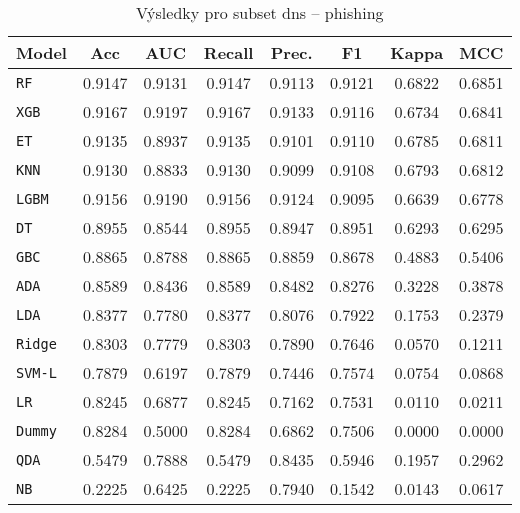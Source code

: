 \begin{table}[H]
  \centering
  \small
  \caption{Výsledky pro subset dns – phishing}
  \begin{tabular}{|l|c|c|c|c|c|c|c|}
    \hline
    \textbf{Model} & \textbf{Acc} & \textbf{AUC} & \textbf{Recall} & \textbf{Prec.} & \textbf{F1} & \textbf{Kappa} & \textbf{MCC} \\
    \hline
    \texttt{RF} & 0.9147 & 0.9131 & 0.9147 & 0.9113 & 0.9121 & 0.6822 & 0.6851 \\
    \texttt{XGB} & 0.9167 & 0.9197 & 0.9167 & 0.9133 & 0.9116 & 0.6734 & 0.6841 \\
    \texttt{ET} & 0.9135 & 0.8937 & 0.9135 & 0.9101 & 0.9110 & 0.6785 & 0.6811 \\
    \texttt{KNN} & 0.9130 & 0.8833 & 0.9130 & 0.9099 & 0.9108 & 0.6793 & 0.6812 \\
    \texttt{LGBM} & 0.9156 & 0.9190 & 0.9156 & 0.9124 & 0.9095 & 0.6639 & 0.6778 \\
    \texttt{DT} & 0.8955 & 0.8544 & 0.8955 & 0.8947 & 0.8951 & 0.6293 & 0.6295 \\
    \texttt{GBC} & 0.8865 & 0.8788 & 0.8865 & 0.8859 & 0.8678 & 0.4883 & 0.5406 \\
    \texttt{ADA} & 0.8589 & 0.8436 & 0.8589 & 0.8482 & 0.8276 & 0.3228 & 0.3878 \\
    \texttt{LDA} & 0.8377 & 0.7780 & 0.8377 & 0.8076 & 0.7922 & 0.1753 & 0.2379 \\
    \texttt{Ridge} & 0.8303 & 0.7779 & 0.8303 & 0.7890 & 0.7646 & 0.0570 & 0.1211 \\
    \texttt{SVM-L} & 0.7879 & 0.6197 & 0.7879 & 0.7446 & 0.7574 & 0.0754 & 0.0868 \\
    \texttt{LR} & 0.8245 & 0.6877 & 0.8245 & 0.7162 & 0.7531 & 0.0110 & 0.0211 \\
    \texttt{Dummy} & 0.8284 & 0.5000 & 0.8284 & 0.6862 & 0.7506 & 0.0000 & 0.0000 \\
    \texttt{QDA} & 0.5479 & 0.7888 & 0.5479 & 0.8435 & 0.5946 & 0.1957 & 0.2962 \\
    \texttt{NB} & 0.2225 & 0.6425 & 0.2225 & 0.7940 & 0.1542 & 0.0143 & 0.0617 \\
    \hline
  \end{tabular}
\end{table}
\vspace{0.5cm}

